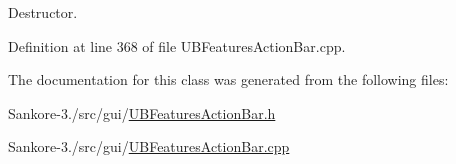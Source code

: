 Destructor. 



Definition at line 368 of file U\-B\-Features\-Action\-Bar.\-cpp.



The documentation for this class was generated from the following files\-:\begin{DoxyCompactItemize}
\item 
Sankore-\/3./src/gui/\hyperlink{_u_b_features_action_bar_8h}{U\-B\-Features\-Action\-Bar.\-h}\item 
Sankore-\/3./src/gui/\hyperlink{_u_b_features_action_bar_8cpp}{U\-B\-Features\-Action\-Bar.\-cpp}\end{DoxyCompactItemize}
